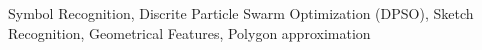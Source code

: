 \documentclass[preprint,10pt,5p,twocolumn]{elsarticle}
\begin{document}
\begin{frontmatter}
\begin{abstract}
\end{abstract}

\begin{keyword}
Symbol Recognition, Discrite Particle Swarm Optimization (DPSO), Sketch Recognition, Geometrical Features, Polygon approximation


\end{keyword}

\end{frontmatter}



\end{document}
